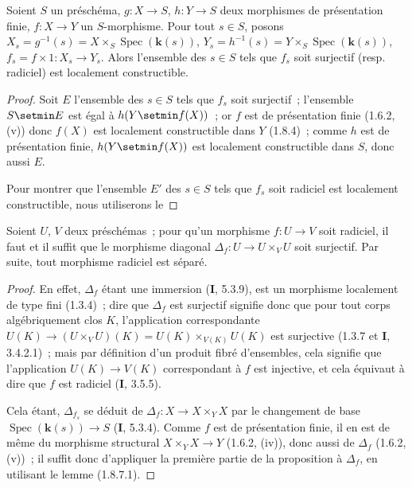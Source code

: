 
\begin{proposition}[1.8.7]
\label{IV.1.8.7-fr}
Soient $S$ un préschéma, $g:X\to S$, $h:Y\to S$ deux morphismes de
présentation finie, $f:X\to Y$ un $S$-morphisme. Pour tout $s\in S$, posons
$X_s=g^{-1}(s)=X\times_S\operatorname{Spec}(\boldsymbol{k}(s))$,
$Y_s=h^{-1}(s)=Y\times_S\operatorname{Spec}(\boldsymbol{k}(s))$,
$f_s=f\times 1:X_s\to Y_s$. Alors l'ensemble des $s\in S$ tels que $f_s$
soit surjectif (\textup{resp.} radiciel) est localement constructible.
\end{proposition}

\begin{proof}
Soit $E$ l'ensemble des $s\in S$ tels que $f_s$ soit surjectif~; l'ensemble
$S\setmin E$ est égal à $h(Y\setmin f(X))$~; or $f$ est de présentation finie (1.6.2, (v))
donc $f(X)$ est localement constructible dans $Y$ (1.8.4)~; comme $h$ est de
présentation finie, $h(Y\setmin f(X))$ est localement constructible dans $S$, donc
aussi $E$.

Pour montrer que l'ensemble $E'$ des $s\in S$ tels que $f_s$ soit radiciel
est localement constructible, nous utiliserons le
\end{proof}

\begin{lemma}[1.8.7.1]
Soient $U$, $V$ deux préschémas~; pour qu'un morphisme $f:U\to V$ soit
radiciel, il faut et il suffit que le morphisme diagonal
$\Delta_f:U\to U\times_VU$ soit surjectif. Par suite, tout morphisme radiciel
est séparé.
\end{lemma}

\begin{proof}
En effet, $\Delta_f$ étant une immersion (\textbf{I}, 5.3.9), est un morphisme
localement de type fini (1.3.4)~; dire que $\Delta_f$ est surjectif signifie
donc que pour tout corps algébriquement clos $K$, l'application
correspondante $U(K)\to(U\times_VU)(K)=U(K)\times_{V(K)}U(K)$ est surjective
(1.3.7 et \textbf{I}, 3.4.2.1)~; mais par définition d'un produit fibré d'ensembles,
cela signifie que l'application $U(K)\to V(K)$ correspondant à $f$ est
injective, et cela équivaut à dire que $f$ est radiciel (\textbf{I}, 3.5.5).

Cela étant, $\Delta_{f_s}$ se déduit de $\Delta_f:X\to X\times_YX$ par le
changement de base $\operatorname{Spec}(\boldsymbol{k}(s))\to S$ (\textbf{I}, 5.3.4). Comme $f$
est de présentation finie, il en est de même du morphisme structural
$X\times_YX\to Y$ (1.6.2, (iv)), donc aussi de $\Delta_f$ (1.6.2, (v))~; il
suffit donc d'appliquer la première partie de la proposition à $\Delta_f$,
en utilisant le lemme (1.8.7.1).
\end{proof}

